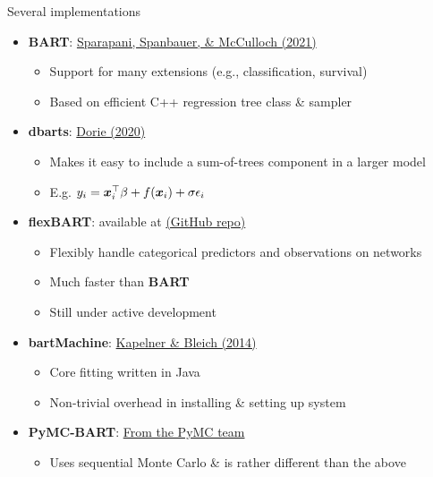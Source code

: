 \documentclass[aspectratio=199]{beamer}
\begin{document}
\begin{frame}{Several implementations}

\begin{itemize}
\item{\textbf{BART}: \href{https://cran.r-project.org/web/packages/BART/index.html}{Sparapani, Spanbauer, \& McCulloch (2021)}}
\begin{itemize}
\item{Support for many extensions (e.g., classification, survival)}
\item{Based on efficient C++ regression tree class \& sampler}
\end{itemize}

\item{\textbf{dbarts}: \href{https://cran.r-project.org/web/packages/dbarts/index.html}{Dorie (2020)}}
\begin{itemize}
\item{Makes it easy to include a sum-of-trees component in a larger model}
\item{E.g. $y_{i} = \bm{x}_{i}^{\top}\beta + f(\bm{x}_{i}) + \sigma \epsilon_{i}$}
\end{itemize}

\item{\textbf{flexBART}: available at \href{https://github.com/skdeshpande91/flexBART}{(GitHub repo)}}
\begin{itemize}
\item{Flexibly handle categorical predictors and observations on networks}
\item{Much faster than \textbf{BART}}
\item{Still under active development}
\end{itemize}

\item{\textbf{bartMachine}: \href{https://cran.r-project.org/web/packages/bartMachine/index.html}{Kapelner \& Bleich (2014)}}
\begin{itemize}
\item{Core fitting written in Java}
\item[\Annoey]{Non-trivial overhead in installing \& setting up system}
\end{itemize}

\item{\textbf{PyMC-BART}: \href{https://www.pymc.io/projects/bart}{From the PyMC team}}
\begin{itemize}
\item{Uses sequential Monte Carlo \& is rather different than the above}
\end{itemize}

\end{itemize}

\end{frame}
\end{document}
